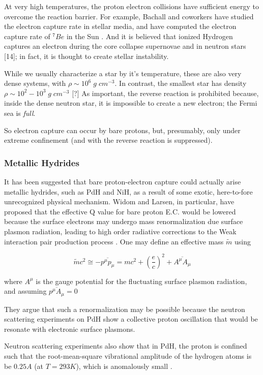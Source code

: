 \documentclass[%
 aip,
 jmp,%
 amsmath,amssymb,
 reprint,%
]{revtex4-1}
\begin{document}
At very high temperatures, the proton electron collisions have sufficient energy to overcome the reaction barrier.   For example, Bachall and coworkers have studied the electron capture rate in stellar media, and have computed the electron capture rate of $^{7}Be$ in the Sun \cite{bachall62,bachall69}. And it is believed that ionized Hydrogen captures an electron during the core collapse supernovae and in neutron stars [14]; in fact, it is thought to create stellar instability.   

While we usually characterize a star by it's temperature, these are also very dense systems, with $\rho\sim 10^6\;g\;cm^{-3}$.  In contrast, the smallest star has density $\rho\sim 10^{2}-10^{3}\;g\;cm^{-3}$ [?]  As important, the reverse reaction is prohibited because, inside the dense neutron star, it is impossible to create a new electron; the Fermi sea is \emph{full}.

So electron capture can occur by bare protons, but, presumably, only under extreme confinement (and with the reverse reaction is suppressed).

\subsubsection{Metallic Hydrides}

It has been suggested that bare proton-electron capture could actually arise metallic hydrides, such as PdH and NiH, as a result of some exotic, here-to-fore unrecognized physical mechanism.  Widom and Larsen, in particular, have proposed that the effective Q value for bare proton E.C. would be lowered because the surface electrons may undergo mass renormalization due surface plasmon radiation, leading to high order radiative corrections to the Weak interaction pair production process \cite{widlar1}.  One may define an effective mass $\tilde{m}$ using

$$\tilde{m}c^{2}\cong-\overline{p^{\mu}p_{\mu}}=mc^{2}+\left(\dfrac{e}{c}\right)^2+\overline{A^{\mu}A_{\mu}}$$

where $A^{\mu}$ is the gauge potential for the fluctuating surface plasmon radiation, and assuming $\overline{p^{\mu}A_{\mu}}=0$

They argue that such a renormalization may be possible because the neutron scattering experiments on PdH show a collective proton oscillation that would be resonate with electronic surface plasmons.

Neutron scattering experiments also show that in PdH, the proton is confined such that the root-mean-square vibrational amplitude of the hydrogen atoms is be $0.25A$ (at $T
=293K$), which is anomalously small \cite{ferguson}.   
\end{document}
